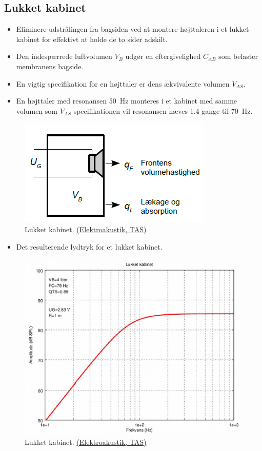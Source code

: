 \subsection{Lukket kabinet}
\begin{itemize}
	\item Eliminere udstrålingen fra bagsiden ved at montere højttaleren i et lukket kabinet for effektivt at holde de to sider adskilt.
	\item Den indespærrede luftvolumen $V_B$ udgør en eftergivelighed $C_{AB}$ som	belaster membranens bagside.
	\item En vigtig specifikation for en højttaler er dens ækvivalente volumen $V_{AS}$.
	\item En højttaler med resonansen \SI{50}{\hertz} monteres i et kabinet med samme volumen som $V_{AS}$ specifikationen vil resonansen hæves 1.4
	gange til \SI{70}{\hertz}.
\end{itemize}

\begin{figure} [H]
	\centering
	\includegraphics[width=0.5\linewidth]{graphics/59.png}
	\caption{Lukket kabinet. \href{http://www.torean.dk/artikel/Elektroakustik.pdf}{(Elektroakustik, TAS)}}
	\label{fig:59}
\end{figure}
\begin{itemize}
	\item Det resulterende lydtryk for et lukket kabinet.
\end{itemize}
\begin{figure} [H]
	\centering
	\includegraphics[width=0.75\linewidth]{graphics/58.png}
	\caption{Lukket kabinet. \href{http://www.torean.dk/artikel/Elektroakustik.pdf}{(Elektroakustik, TAS)}}
	\label{fig:58}
\end{figure}


